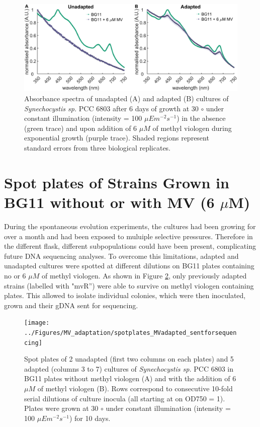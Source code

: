 \documentclass[12pt]{article}
\begin{document}
\begin{figure}[H]
    \centering
    \includegraphics[width=\hsize]{../Figures/MV_adaptation/spectra_endpoint_firstevolution_Wt_6umMV.png}
    \caption{Absorbance spectra of unadapted (A) and adapted (B) cultures of \textit{Synechocystis sp.} PCC 6803 after 6 days of growth at 30 $\circ$ under constant illumination (intensity = 100 $\mu Em^{-2}s^{-1}$) in the absence (green trace) and upon addition  of 6 $\mu M$ of methyl viologen during exponential growth (purple trace). Shaded regions represent standard errors from three biological replicates.}
    \label{fig:spectraMV1}
\end{figure}

\section{Spot plates of Strains Grown in BG11 without or with MV (6 $\mu$M)}
During the spontaneous evolution experiments, the cultures had been growing for over a month and had been exposed to muluiple selective pressures. Therefore in the different flask, different subpopulations could have been present, complicating future DNA sequencing analyses. To overcome this limitations, adapted and unadapted cultures were spotted at different dilutions on BG11 plates containing no or 6 $\mu M$ of methyl viologen. As shown in Figure \ref{fig:spotassayMV}, only previously adapted strains (labelled with "mvR'') were able to survive on methyl viologen containing plates. This allowed to isolate individual colonies, which were then inoculated, grown and their gDNA sent for sequencing.

\begin{figure}[H]
    \centering
    \texttt{[image: ../Figures/MV\_adaptation/spotplates\_MVadapted\_sentforsequencing]}
    \caption{Spot plates of 2 unadapted (first two columns on each plates) and 5 adapted (columns 3 to 7) cultures of \textit{Synechocystis sp.} PCC 6803 in BG11 plates without methyl viologen (A) and with the addition of 6 $\mu M$ of methyl viologen (B). Rows correspond to consecutive 10-fold serial dilutions of culture inocula (all starting at on OD750 = 1). Plates were grown at 30 $\circ$ under constant illumination (intensity = 100 $\mu Em^{-2}s^{-1}$) for 10 days.}
    \label{fig:spotassayMV}
\end{figure}
\end{document}
